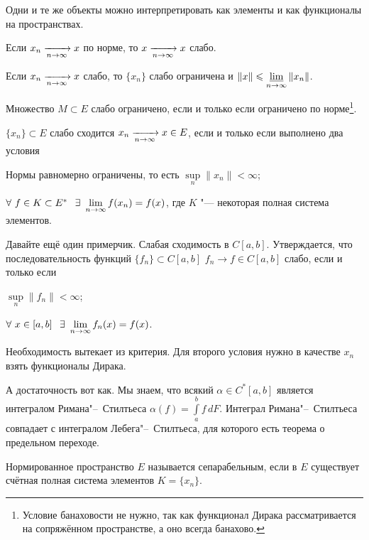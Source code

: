 Одни и те же объекты можно интерпретировать как элементы и как функционалы на пространствах.
\begin{Ut}
  Если $x_n\te x$ по норме, то $x\te x$ слабо.
\end{Ut}
\begin{Ut}
  Если $x_n\te x$ слабо, то $\{x_n\}$ слабо ограничена и $\|x\|\le\varliminf\limits_{n\to\infty} \|x_n\|$.
\end{Ut}
\begin{Ut}
  Множество $M\subset E$ слабо ограничено, если и только если ограничено по норме\footnote{Условие банаховости не нужно, так как функционал Дирака рассматривается на сопряжённом пространстве, а оно всегда банахово.}.
\end{Ut}
\begin{The}
  $\{x_n\}\subset E$ слабо сходится $x_n\te x\in E$, если и только если выполнено два условия
\begin{roItems}
  \item Нормы равномерно  ограничены, то есть $\sup\limits_n\|x_n\|<\infty$;
  \item $\forall\ f\in K\subset E^*\pau \exists\ \yo n\infty f(x_n) = f(x)$, где $K$ "--- некоторая полная система элементов.
\end{roItems}
\end{The}

Давайте ещё один примерчик. Слабая сходимость в $C[a,b]$. Утверждается, что последовательность функций $\{f_n\}\subset C[a,b]$ $f_n\to f\in C[a,b]$ слабо, если и только если
\begin{roItems}
  \item $\sup\limits_n\|f_n\|<\infty$;
  \item $\forall\ x\in [a,b]\pau \exists\ \yo n\infty f_n(x) = f(x)$.
\end{roItems}
\begin{Proof}
  Необходимость вытекает из критерия. Для второго условия нужно в качестве $x_n$ взять функционалы Дирака.

 А достаточность вот как. Мы знаем, что всякий $\alpha\in C^*[a,b]$ является интегралом Римана"--~Стилтьеса $\alpha(f) = \int\limits_a^b f\,dF$. Интеграл Римана"--~Стилтьеса совпадает с интегралом Лебега"--~Стилтьеса, для которого есть теорема о предельном переходе.
\end{Proof}
\begin{Def}
  Нормированное пространство $E$  называется сепарабельным, если в $E$ существует счётная полная система элементов $K = \{x_n\}$.
\end{Def}


